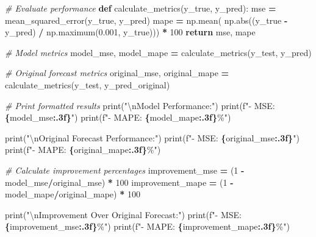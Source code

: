 \documentclass[mstat,12pt]{unswthesis}
\newenvironment{Shaded}{\begin{snugshade}}{\end{snugshade}}
\newcommand{\BuiltInTok}[1]{#1}
\newcommand{\CharTok}[1]{\textcolor[rgb]{0.31,0.60,0.02}{#1}}
\newcommand{\CommentTok}[1]{\textcolor[rgb]{0.56,0.35,0.01}{\textit{#1}}}
\newcommand{\ControlFlowTok}[1]{\textcolor[rgb]{0.13,0.29,0.53}{\textbf{#1}}}
\newcommand{\DecValTok}[1]{\textcolor[rgb]{0.00,0.00,0.81}{#1}}
\newcommand{\FloatTok}[1]{\textcolor[rgb]{0.00,0.00,0.81}{#1}}
\newcommand{\KeywordTok}[1]{\textcolor[rgb]{0.13,0.29,0.53}{\textbf{#1}}}
\newcommand{\NormalTok}[1]{#1}
\newcommand{\OperatorTok}[1]{\textcolor[rgb]{0.81,0.36,0.00}{\textbf{#1}}}
\newcommand{\SpecialCharTok}[1]{\textcolor[rgb]{0.81,0.36,0.00}{\textbf{#1}}}
\newcommand{\SpecialStringTok}[1]{\textcolor[rgb]{0.31,0.60,0.02}{#1}}
\newcommand{\StringTok}[1]{\textcolor[rgb]{0.31,0.60,0.02}{#1}}
\begin{document}
\begin{Shaded}
\begin{Highlighting}[]
\CommentTok{\# Evaluate performance}
\KeywordTok{def}\NormalTok{ calculate\_metrics(y\_true, y\_pred):}
\NormalTok{    mse }\OperatorTok{=}\NormalTok{ mean\_squared\_error(y\_true, y\_pred)}
\NormalTok{    mape }\OperatorTok{=}\NormalTok{ np.mean(}
\NormalTok{        np.}\BuiltInTok{abs}\NormalTok{((y\_true }\OperatorTok{{-}}\NormalTok{ y\_pred) }\OperatorTok{/}\NormalTok{ np.maximum(}\FloatTok{0.001}\NormalTok{, y\_true))) }\OperatorTok{*} \DecValTok{100}
    \ControlFlowTok{return}\NormalTok{ mse, mape}

\CommentTok{\# Model metrics}
\NormalTok{model\_mse, model\_mape }\OperatorTok{=}\NormalTok{ calculate\_metrics(y\_test, y\_pred)}

\CommentTok{\# Original forecast metrics}
\NormalTok{original\_mse, original\_mape }\OperatorTok{=}\NormalTok{ calculate\_metrics(y\_test, y\_pred\_original)}

\CommentTok{\# Print formatted results}
\BuiltInTok{print}\NormalTok{(}\StringTok{"}\CharTok{\textbackslash{}n}\StringTok{Model Performance:"}\NormalTok{)}
\BuiltInTok{print}\NormalTok{(}\SpecialStringTok{f"{-} MSE: }\SpecialCharTok{\{}\NormalTok{model\_mse}\SpecialCharTok{:.3f\}}\SpecialStringTok{"}\NormalTok{)}
\BuiltInTok{print}\NormalTok{(}\SpecialStringTok{f"{-} MAPE: }\SpecialCharTok{\{}\NormalTok{model\_mape}\SpecialCharTok{:.3f\}}\SpecialStringTok{\%"}\NormalTok{)}

\BuiltInTok{print}\NormalTok{(}\StringTok{"}\CharTok{\textbackslash{}n}\StringTok{Original Forecast Performance:"}\NormalTok{)}
\BuiltInTok{print}\NormalTok{(}\SpecialStringTok{f"{-} MSE: }\SpecialCharTok{\{}\NormalTok{original\_mse}\SpecialCharTok{:.3f\}}\SpecialStringTok{"}\NormalTok{)}
\BuiltInTok{print}\NormalTok{(}\SpecialStringTok{f"{-} MAPE: }\SpecialCharTok{\{}\NormalTok{original\_mape}\SpecialCharTok{:.3f\}}\SpecialStringTok{\%"}\NormalTok{)}

\CommentTok{\# Calculate improvement percentages}
\NormalTok{improvement\_mse }\OperatorTok{=}\NormalTok{ (}\DecValTok{1} \OperatorTok{{-}}\NormalTok{ model\_mse}\OperatorTok{/}\NormalTok{original\_mse) }\OperatorTok{*} \DecValTok{100}
\NormalTok{improvement\_mape }\OperatorTok{=}\NormalTok{ (}\DecValTok{1} \OperatorTok{{-}}\NormalTok{ model\_mape}\OperatorTok{/}\NormalTok{original\_mape) }\OperatorTok{*} \DecValTok{100}

\BuiltInTok{print}\NormalTok{(}\StringTok{"}\CharTok{\textbackslash{}n}\StringTok{Improvement Over Original Forecast:"}\NormalTok{)}
\BuiltInTok{print}\NormalTok{(}\SpecialStringTok{f"{-} MSE: }\SpecialCharTok{\{}\NormalTok{improvement\_mse}\SpecialCharTok{:.3f\}}\SpecialStringTok{\%"}\NormalTok{)}
\BuiltInTok{print}\NormalTok{(}\SpecialStringTok{f"{-} MAPE: }\SpecialCharTok{\{}\NormalTok{improvement\_mape}\SpecialCharTok{:.3f\}}\SpecialStringTok{\%"}\NormalTok{)}


\end{Highlighting}
\end{Shaded}
\end{document}
